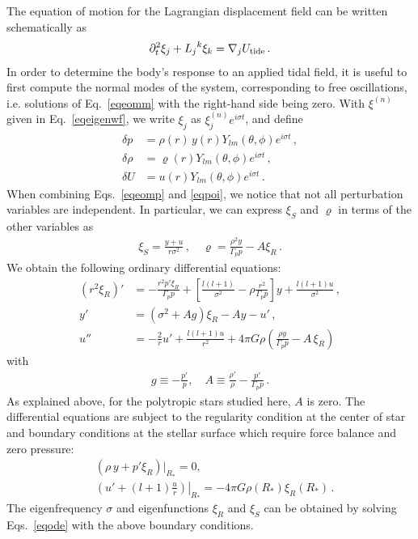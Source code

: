 \documentclass[prd,aps,floatfix,superscriptaddress,nofootinbib,twocolumn,10pt,English]{revtex4}
\begin{document}
The equation of motion for the Lagrangian displacement field can be written schematically as
\begin{align}\label{eqeomm}
\partial^2_t \xi_j +{L_j}^k \xi_k =\nabla_j U_{\rm tide}\,.
\end{align}
In order to determine the body's response to an applied tidal field, it is
useful to first compute the normal modes of the system, corresponding to free
oscillations, i.e. solutions of Eq.~\eqref{eqeomm} with the right-hand side being
zero. With $\xi^{(n)}$ given in Eq.~\eqref{eqeigenwf}, we write $\xi_j$ as
$\xi^{(n)}_j e^{i \sigma t}$, and define
\begin{align}\label{eqp}
\delta p & = \rho(r)\, y(r) Y_{lm}(\theta, \phi) e^{i \sigma t}\,,\nonumber\\
\delta \rho & = \varrho(r) Y_{lm}(\theta, \phi) e^{i \sigma t} \,,\nonumber \\
\delta U & = u(r) Y_{lm}(\theta, \phi) e^{i \sigma t}\,.
\end{align}
When combining Eqs.~\eqref{eqeomp} and \eqref{eqpoi}, we notice that not all
perturbation variables are independent. In particular, we can express $\xi_S$
and $\varrho$ in terms of the other variables as 
\begin{align}
\xi_S = \frac{y+u}{r \sigma^2}\,,\quad \varrho = \frac{\rho^2 y}{\Gamma_p p}-A \xi_R\,.
\end{align}
We obtain the following ordinary differential equations:
\begin{align}\label{eqode}
(r^2 \xi_R)' & = -\frac{r^2 p' \xi_R}{\Gamma_p p}+\left [ \frac{l(l+1)}{\sigma^2} - \rho \frac{r^2}{\Gamma_p p}\right ] y+ \frac{l(l+1) u}{\sigma^2}\,,\nonumber\\
y' & = (\sigma^2+A g) \xi_R-A y-u'\,,\nonumber\\
u'' & = -\frac{2}{r } u'+\frac{l(l+1) u}{r^2}+4 \pi G \rho \left ( \frac{\rho y}{\Gamma_p p} - A \,\xi_R \right )\,
\end{align}
with
\begin{align}
g \equiv - \frac{p'}{p},\quad A \equiv \frac{\rho'}{\rho} -\frac{p'}{\Gamma_p p}\,.
\end{align}
As explained above, for the polytropic stars studied here, $A$ is zero. The
differential equations are subject to the regularity condition at the center of star
and boundary conditions at the stellar surface which require force balance and
zero pressure:
\begin{align}
& (\rho \,y+ p' \xi_R) |_{R_*} =0,\nonumber \\
 & \left. \left ( u'+(l+1)\frac{u}{r} \right ) \right|_{R_*} =-4 \pi G \rho(R_*) \xi_R(R_*)\,.
\end{align}
The eigenfrequency $\sigma$ and eigenfunctions $\xi_R$ and $\xi_S$ can be obtained by solving 
Eqs.~\eqref{eqode} with the above boundary conditions.

%

\end{document}
